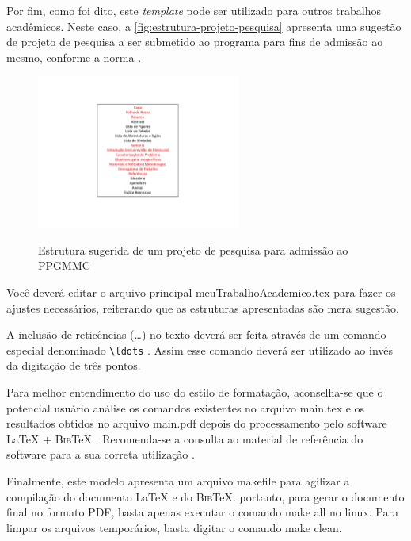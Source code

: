 \begin{apendicesenv}
Por fim, como foi dito, este  \emph{template} pode ser utilizado para outros trabalhos acadêmicos. Neste caso, a \autoref{fig:estrutura-projeto-pesquisa} apresenta uma sugestão de projeto de pesquisa a ser submetido ao programa para fins de admissão ao mesmo, conforme a norma .

\begin{figure}[!htb]
    \centering
    \caption{Estrutura sugerida de um projeto de pesquisa para admissão ao PPGMMC}
    \includegraphics[width=0.6\textwidth]{./04-figuras/estrutura-projeto-pesquisa}
    \label{fig:estrutura-projeto-pesquisa}
\end{figure}

Você deverá editar o arquivo principal {\ttfamily meuTrabalhoAcademico.tex} para fazer os ajustes necessários, reiterando que as estruturas apresentadas são mera sugestão.

A inclusão de reticências (\ldots) no texto deverá ser feita através de um comando especial denominado \verb|\ldots| \cite{LaTeX2014}. Assim esse comando deverá ser utilizado ao invés da digitação de três pontos.

Para melhor entendimento do uso do estilo de formatação, aconselha-se que o potencial usuário análise os comandos existentes no arquivo {\ttfamily main.tex} e os resultados obtidos no arquivo {\ttfamily main.pdf} depois do processamento pelo software \LaTeX{} + \textsc{Bib}\TeX{} \cite{LaTeX2014,BibTeX2014}.
Recomenda-se a consulta ao material de referência do software para a sua correta utilização \cite{Lamport1986,Buerger1989,Kopka2003,Mittelbach2004}.

Finalmente, este modelo apresenta um arquivo {\ttfamily makefile} para agilizar a compilação do documento \LaTeX{} e do \textsc{Bib}\TeX{}. portanto, para gerar o documento final no formato PDF, basta apenas executar o comando {\ttfamily make all} no linux. Para limpar os arquivos temporários, basta digitar o comando {\ttfamily make clean}.


\end{apendicesenv}
